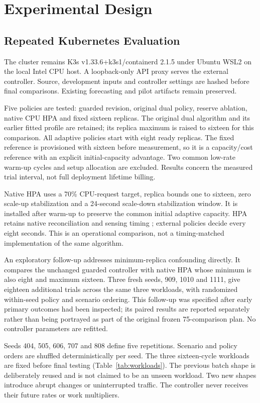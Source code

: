 \documentclass[10pt,twocolumn,a4paper]{article}
\begin{document}
\section{Experimental Design}
\subsection{Repeated Kubernetes Evaluation}
The cluster remains K3s v1.33.6+k3s1/containerd 2.1.5 under Ubuntu WSL2 on the local Intel CPU host. A loopback-only API proxy serves the external controller. Source, development inputs and controller settings are hashed before final comparisons. Existing forecasting and pilot artifacts remain preserved.

Five policies are tested: guarded revision, original dual policy, reserve ablation, native CPU HPA and fixed sixteen replicas. The original dual algorithm and its earlier fitted profile are retained; its replica maximum is raised to sixteen for this comparison. All adaptive policies start with eight ready replicas. The fixed reference is provisioned with sixteen before measurement, so it is a capacity/cost reference with an explicit initial-capacity advantage. Two common low-rate warm-up cycles and setup allocation are excluded. Results concern the measured trial interval, not full deployment lifetime billing.

Native HPA uses a 70\% CPU-request target, replica bounds one to sixteen, zero scale-up stabilization and a 24-second scale-down stabilization window. It is installed after warm-up to preserve the common initial adaptive capacity. HPA retains native reconciliation and sensing timing \cite{j01}; external policies decide every eight seconds. This is an operational comparison, not a timing-matched implementation of the same algorithm.

An exploratory follow-up addresses minimum-replica confounding directly. It compares the unchanged guarded controller with native HPA whose minimum is also eight and maximum sixteen. Three fresh seeds, 909, 1010 and 1111, give eighteen additional trials across the same three workloads, with randomized within-seed policy and scenario ordering. This follow-up was specified after early primary outcomes had been inspected; its paired results are reported separately rather than being portrayed as part of the original frozen 75-comparison plan. No controller parameters are refitted.

Seeds 404, 505, 606, 707 and 808 define five repetitions. Scenario and policy orders are shuffled deterministically per seed. The three sixteen-cycle workloads are fixed before final testing (Table~\ref{tab:workloads}). The previous batch shape is deliberately reused and is not claimed to be an unseen workload. Two new shapes introduce abrupt changes or uninterrupted traffic. The controller never receives their future rates or work multipliers.
\end{document}
